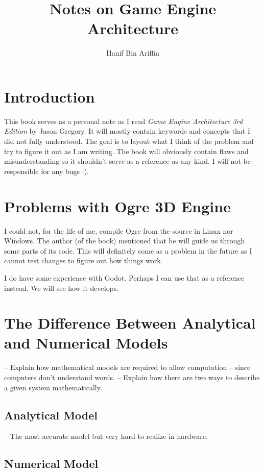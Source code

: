 \documentclass[a4paper,12pt]{book}
\author{Hanif Bin Ariffin}
\title{Notes on Game Engine Architecture}
\begin{document}
\maketitle
\tableofcontents


\section{Introduction}

This book serves as a personal note as I read \textit{Game Engine Architecture 3rd Edition} by Jason Gregory.
It will mostly contain keywords and concepts that I did not fully understood.
The goal is to layout what I think of the problem and try to figure it out as I am writing.
The book will obviously contain flaws and misunderstanding so it shouldn't serve as a reference as any kind.
I will not be responsible for any bugs :).


\section{Problems with Ogre 3D Engine}

I could not, for the life of me, compile Ogre from the source in Linux nor Windows.
The author (of the book) mentioned that he will guide us through some parts of its code.
This will definitely come as a problem in the future as I cannot test changes to figure out how things work.

I do have some experience with Godot.
Perhaps I can use that as a reference instead.
We will see how it develops.

\section{The Difference Between Analytical and Numerical Models}

-- Explain how mathematical models are required to allow computation -- since computers don't understand words.
-- Explain how there are two ways to describe a given system mathematically.

\subsection{Analytical Model}

-- The most accurate model but very hard to realize in hardware.

\subsection{Numerical Model}
\end{document}
